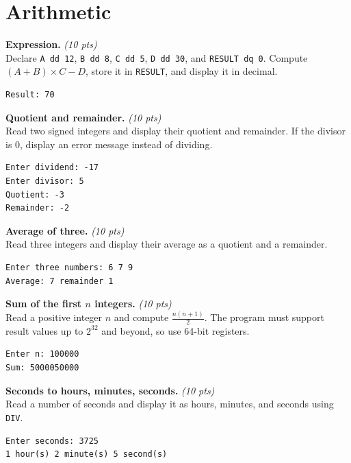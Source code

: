 \documentclass[11pt,letterpaper]{article}
\newcommand{\pts}[1]{\hfill\textit{(#1 pts)}}
\newcommand{\ttl}[1]{\textbf{#1.}}
\begin{document}
\section{Arithmetic}

\begin{problems}

\item \ttl{Expression} \pts{10}
\\Declare \texttt{A dd 12}, \texttt{B dd 8}, \texttt{C dd 5}, \texttt{D dd 30}, and \texttt{RESULT dq 0}. Compute $(A+B)\times C - D$, store it in \texttt{RESULT}, and display it in decimal.
\begin{lstlisting}[style=out]
Result: 70
\end{lstlisting}

\item \ttl{Quotient and remainder} \pts{10}
\\Read two signed integers and display their quotient and remainder. If the divisor is 0, display an error message instead of dividing.
\begin{lstlisting}[style=out]
Enter dividend: -17
Enter divisor: 5
Quotient: -3
Remainder: -2
\end{lstlisting}

\item \ttl{Average of three} \pts{10}
\\Read three integers and display their average as a quotient and a remainder.
\begin{lstlisting}[style=out]
Enter three numbers: 6 7 9
Average: 7 remainder 1
\end{lstlisting}

\item \ttl{Sum of the first $n$ integers} \pts{10}
\\Read a positive integer $n$ and compute $\frac{n(n+1)}{2}$. The program must support result values up to $2^{32}$ and beyond, so use 64-bit registers.
\begin{lstlisting}[style=out]
Enter n: 100000
Sum: 5000050000
\end{lstlisting}

\item \ttl{Seconds to hours, minutes, seconds} \pts{10}
\\Read a number of seconds and display it as hours, minutes, and seconds using \texttt{DIV}.
\begin{lstlisting}[style=out]
Enter seconds: 3725
1 hour(s) 2 minute(s) 5 second(s)
\end{lstlisting}


\end{problems}
\end{document}
